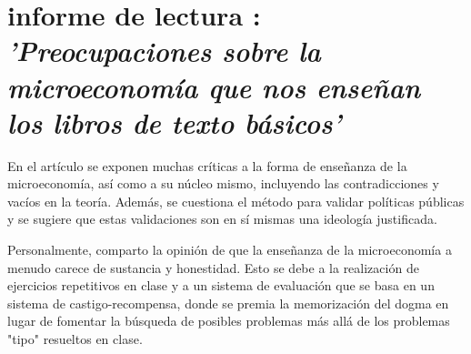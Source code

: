 \documentclass[12pt]{article}
\begin{document}
\section{informe de lectura \citet{monsalve2021}: \textit{'Preocupaciones sobre la microeconomía que nos enseñan los libros de texto básicos'}}
\begin{flushleft}
    En el artículo se exponen muchas críticas a la forma de enseñanza de la microeconomía, así como a su núcleo mismo, incluyendo las contradicciones y vacíos en la teoría. Además, se cuestiona el método para validar políticas públicas y se sugiere que estas validaciones son en sí mismas una ideología justificada.

    Personalmente, comparto la opinión de que la enseñanza de la microeconomía a menudo carece de sustancia y honestidad. Esto se debe a la realización de ejercicios repetitivos en clase y a un sistema de evaluación que se basa en un sistema de castigo-recompensa, donde se premia la memorización del dogma en lugar de fomentar la búsqueda de posibles problemas más allá de los problemas "tipo" resueltos en clase.
    

\end{flushleft}
\end{document}
